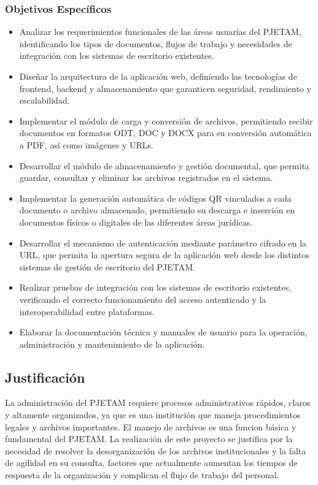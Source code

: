 \subsubsection{Objetivos Específicos}
\label{subsec:objetivos_especificos}
\begin{itemize}
    \item Analizar los requerimientos funcionales de las áreas usuarias del PJETAM, identificando los tipos de documentos, flujos de trabajo y necesidades de integración con los sistemas de escritorio existentes.
    \item Diseñar la arquitectura de la aplicación web, definiendo las tecnologías de frontend, backend y almacenamiento que garanticen seguridad, rendimiento y escalabilidad.
    \item Implementar el módulo de carga y conversión de archivos, permitiendo recibir documentos en formatos ODT, DOC y DOCX para su conversión automática a PDF, así como imágenes y URLs.
    \item Desarrollar el módulo de almacenamiento y gestión documental, que permita guardar, consultar y eliminar los archivos registrados en el sistema.
    \item Implementar la generación automática de códigos QR vinculados a cada documento o archivo almacenado, permitiendo su descarga e inserción en documentos físicos o digitales de las diferentes áreas jurídicas.
    \item Desarrollar el mecanismo de autenticación mediante parámetro cifrado en la URL, que permita la apertura segura de la aplicación web desde los distintos sistemas de gestión de escritorio del PJETAM.
    \item Realizar pruebas de integración con los sistemas de escritorio existentes, verificando el correcto funcionamiento del acceso autenticado y la interoperabilidad entre plataformas.
    \item Elaborar la documentación técnica y manuales de usuario para la operación, administración y mantenimiento de la aplicación.
\end{itemize}

\subsection{Justificación}
\label{sec:justificacion}
La administración del PJETAM requiere procesos administrativos rápidos, claros y altamente organizados, ya que es una institución que maneja procedimientos legales y archivos importantes. El manejo de archivos es una funcion básica y fundamental del PJETAM. La realización de este proyecto se justifica por la necesidad de resolver la desorganización de los archivos institucionales y la falta de agilidad en su consulta, factores que actualmente aumentan los tiempos de respuesta de la organización y complican el flujo de trabajo del personal.

